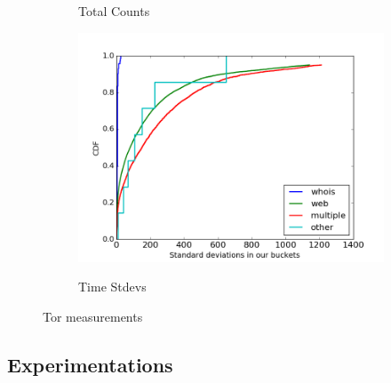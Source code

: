 \begin{figure}
\begin{subfigure}[t]{0.32\textwidth}
		\label{fig:stats_b}
		\caption{Total Counts}
	\end{subfigure}
	\begin{subfigure}[t]{0.32\textwidth}
		\centering
		\includegraphics[scale=0.3]{images/stddevs.png}
		\label{fig:stats_c}
		\caption{Time Stdevs}
	\end{subfigure}
	\label{fig:measurements}
	\caption{Tor measurements}
\end{figure}

\subsection{Experimentations}